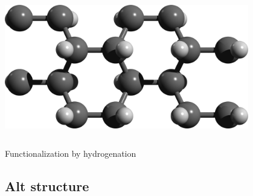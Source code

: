 \documentclass{beamer}
\begin{document}
\begin{frame}
\begin{columns}
\begin{center}
\vspace{7mm}
\includegraphics[width=0.8\textwidth]{figs/boat.png}\\

\vspace{3mm}
\end{center}

\end{columns}

\begin{center}

{\huge Functionalization by hydrogenation}
\end{center}
\end{frame}




\subsection{Alt structure}
\end{document}

